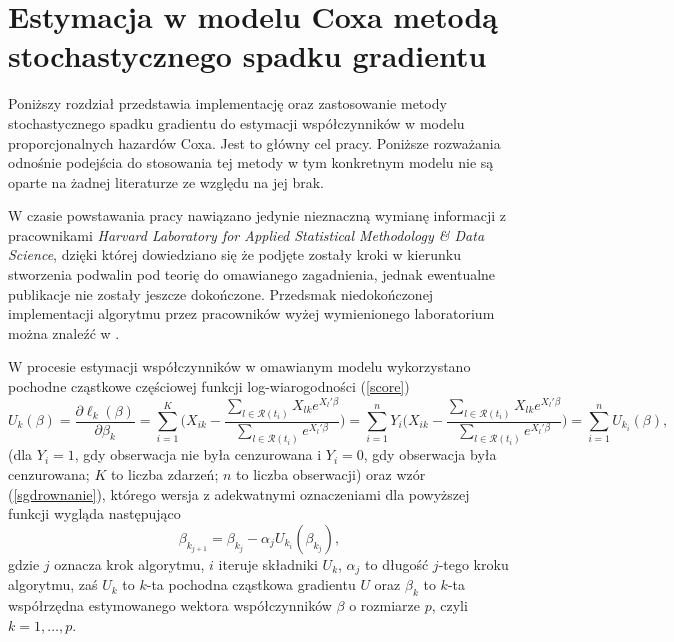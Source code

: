 \chapter{Estymacja w modelu Coxa metodą stochastycznego spadku gradientu}\label{rozdz4}

Poniższy rozdział przedstawia implementację oraz zastosowanie metody stochastycznego spadku gradientu do estymacji współczynników w modelu proporcjonalnych hazardów Coxa. Jest to główny cel pracy. Poniższe rozważania odnośnie podejścia do stosowania tej metody w tym konkretnym modelu nie są oparte na żadnej literaturze ze względu na jej brak.

W czasie powstawania pracy nawiązano jedynie nieznaczną wymianę informacji z pracownikami \textit{Harvard Laboratory for Applied Statistical Methodology \& Data Science}, dzięki której dowiedziano się że podjęte zostały kroki w kierunku stworzenia podwalin pod teorię do omawianego zagadnienia, jednak ewentualne publikacje nie zostały jeszcze dokończone. Przedsmak niedokończonej implementacji algorytmu przez pracowników wyżej wymienionego laboratorium można znaleźć w \cite{sgdpkg}.

W procesie estymacji współczynników w omawianym modelu wykorzystano pochodne cząstkowe częściowej funkcji log-wiarogodności (\ref{score})
\begin{equation*}
U_k(\beta)=\dfrac{\partial\ell_k(\beta)}{\partial\beta_k}=\sum\limits_{i=1}^{K}\Big(X_{ik}-\dfrac{\sum\limits_{l\in \mathscr{R}(t_i)}^{} X_{lk} e^{X_l'\beta}}{\sum\limits_{l\in \mathscr{R}(t_i)}^{} e^{X_l'\beta}}\Big)=\sum\limits_{i=1}^{n}Y_i\Big(X_{ik}-\dfrac{\sum\limits_{l\in \mathscr{R}(t_i)}^{} X_{lk} e^{X_l'\beta}}{\sum\limits_{l\in \mathscr{R}(t_i)}^{} e^{X_l'\beta}}\Big)=\sum\limits_{i=1}^{n}U_{k_{i}}(\beta),
\end{equation*}
(dla $Y_i = 1$, gdy obserwacja nie była cenzurowana i $Y_i = 0$, gdy obserwacja była cenzurowana; $K$ to liczba zdarzeń; $n$ to liczba obserwacji) oraz wzór (\ref{sgdrownanie}), którego wersja z adekwatnymi oznaczeniami dla powyższej funkcji wygląda następująco
\begin{equation}\label{opta}
\beta_{k_{j+1}} = \beta_{k_{j}} - \alpha_{j}U_{k_{i}}(\beta_{k_{j}}),
\end{equation}
gdzie $j$ oznacza krok algorytmu, $i$ iteruje składniki $U_{k}$, $\alpha_j$ to długość $j$-tego kroku algorytmu, zaś $U_{k}$ to $k$-ta pochodna cząstkowa gradientu $U$ oraz $\beta_{k}$ to $k$-ta współrzędna estymowanego wektora współczynników $\beta$ o rozmiarze $p$, czyli $k=1,\dots,p$. 

